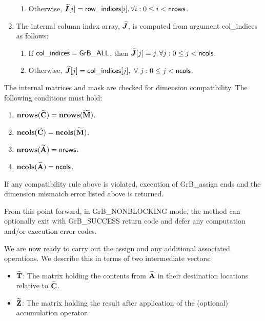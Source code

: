 \begin{enumerate}
\begin{enumerate}
		\item	Otherwise, $\bm{\widetilde{I}}[i] = {\sf row\_indices}[i], 
        \forall i : 0 \leq i < {\sf nrows}$.
    \end{enumerate}
    
    \item The internal column index array, $\bm{\widetilde{J}}$, is computed from 
    argument {\sf col\_indices} as follows:
	\begin{enumerate}
		\item	If ${\sf col\_indices} = {\sf GrB\_ALL}$, then 
        $\bm{\widetilde{J}}[j] = j, \forall j : 0 \leq j < {\sf ncols}$.

		\item	Otherwise, $\bm{\widetilde{J}}[j] = {\sf col\_indices}[j], 
        \ \forall \ j : 0 \leq j < {\sf ncols}$.
    \end{enumerate}
\end{enumerate}

The internal matrices and mask are checked for dimension compatibility. The following
conditions must hold:
\begin{enumerate}
    \item $\bold{nrows}({\bf \widetilde{C}}) = \bold{nrows}({\bf \widetilde{M}})$.

    \item $\bold{ncols}({\bf \widetilde{C}}) = \bold{ncols}({\bf \widetilde{M}})$.

    \item $\bold{nrows}({\bf \widetilde{A}}) = {\sf nrows}$.

    \item $\bold{ncols}({\bf \widetilde{A}}) = {\sf ncols}$.
\end{enumerate}
If any compatibility rule above is violated, execution of {\sf GrB\_assign} ends and
the dimension mismatch error listed above is returned.

From this point forward, in {\sf GrB\_NONBLOCKING} mode, the method can 
optionally exit with {\sf GrB\_SUCCESS} return code and defer any computation 
and/or execution error codes.

We are now ready to carry out the assign and any additional 
associated operations.  We describe this in terms of two intermediate vectors:
\begin{itemize}
    \item ${\bf \widetilde{T}}$: The matrix holding the contents from
    ${\bf \widetilde{A}}$ in their destination locations relative to
    ${\bf \widetilde{C}}$.

    \item ${\bf \widetilde{Z}}$: The matrix holding the result after 
    application of the (optional) accumulation operator.
\end{itemize}

